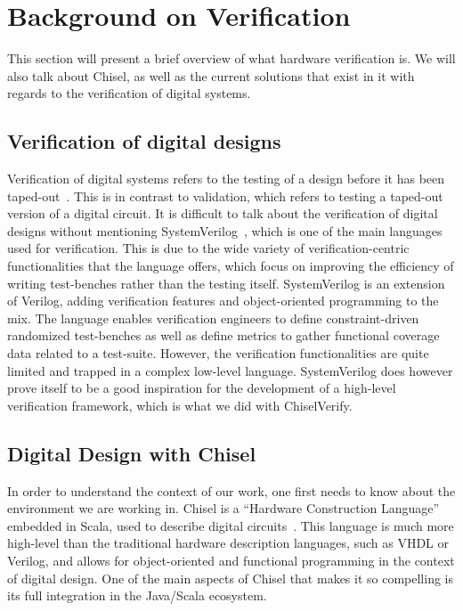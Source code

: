 \documentclass[conference]{IEEEtran}
\begin{document}
\section{Background on Verification}
\label{sec:background}

This section will present a brief overview of what hardware verification is. We will also talk about Chisel, as well as the current solutions that exist in it with regards to the verification of digital systems.

\subsection{Verification of digital designs}
Verification of digital systems refers to the testing of a design before it has been taped-out~\cite{spear2008systemverilog}. This is in contrast to validation, which refers to testing a taped-out version of a digital circuit. 
It is difficult to talk about the verification of digital designs without mentioning SystemVerilog~\cite{SystemVerilog}, which is one of the main languages used for verification.
This is due to the wide variety of verification-centric functionalities that the language offers, which focus on improving the efficiency of writing test-benches rather than the testing itself.
SystemVerilog is an extension of Verilog, adding verification features and object-oriented programming to the mix. 
The language enables verification engineers to define constraint-driven randomized test-benches as well as define metrics to gather functional coverage data related to a test-suite. 
However, the verification functionalities are quite limited and trapped in a complex low-level language. 
SystemVerilog does however prove itself to be a good inspiration for the development of a high-level verification framework, which is what we did with ChiselVerify.

\subsection{Digital Design with Chisel}
In order to understand the context of our work, one first needs to know about the environment we are working in.
Chisel is a ``Hardware Construction Language'' embedded in Scala, used to describe digital circuits~\cite{chisel:dac2012}.
This language is much more high-level than the traditional hardware description languages, such as VHDL or Verilog, and allows for object-oriented and functional programming in the context of digital design.
One of the main aspects of Chisel that makes it so compelling is its full integration in the Java/Scala ecosystem.
\end{document}
